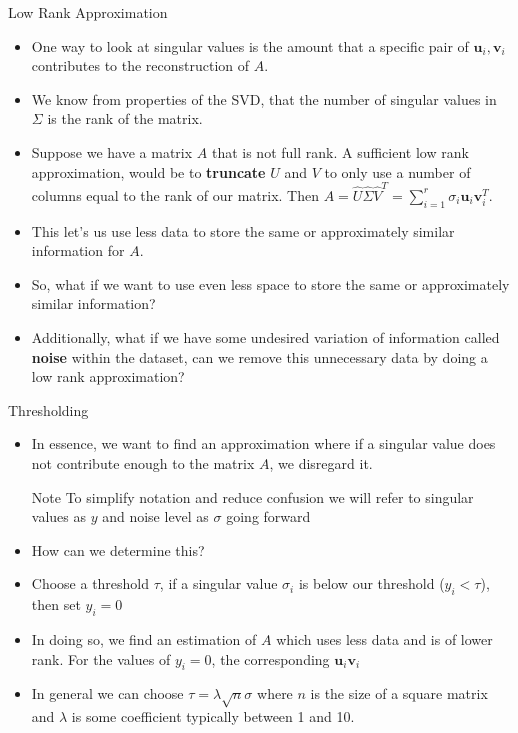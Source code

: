 \documentclass[aspectratio=169,xcolor=dvipsnames]{beamer}
\renewcommand{\vec}[1]{\mathbf{#1}}
\begin{document}
	
	\begin{frame}{Low Rank Approximation}
		\begin{itemize}
			\item One way to look at singular values is the amount that a specific pair of $\vec{u}_i, \vec{v}_i$ contributes to the reconstruction of $A$.
			\item We know from properties of the SVD, that the number of singular values in $\Sigma$ is the rank of the matrix.
			\item Suppose we have a matrix $A$ that is not full rank. A sufficient low rank approximation, would be to \textbf{truncate} $U$ and $V$ to only use a number of columns equal to the rank of our matrix. Then $A = \hat{U}\hat{\Sigma}\hat{V}^T = \sum_{i=1}^{r} \sigma_i\vec{u}_i\vec{v}_i^T$. 
			\item This let's us use less data to store the same or approximately similar information for $A$.
			\item So, what if we want to use even less space to store the same or approximately similar information?
			\item Additionally, what if we have some undesired variation of information called \textbf{noise} within the dataset, can we remove this unnecessary data by doing a low rank approximation?
		\end{itemize}
	\end{frame}
	
	\begin{frame}{Thresholding}
		\begin{itemize}
			\item In essence, we want to find an approximation where if a singular value does not contribute enough to the matrix $A$, we disregard it.
	\begin{block}{Note}
		To simplify notation and reduce confusion we will refer to singular values as $y$ and noise level as $\sigma$ going forward
	\end{block}
			\item How can we determine this?
			\item Choose a threshold $\tau$, if a singular value $\sigma_i$ is below our threshold ($y_i < \tau$), then set $y_i=0$
			\item In doing so, we find an estimation of $A$ which uses less data and is of lower rank. For the values of $y_i = 0$, the corresponding $\vec{u}_i\vec{v}_i$
			\item In general we can choose $\tau = \lambda\sqrt{n}\sigma$\cite{Chatterjee2015} where $n$ is the size of a square matrix and $\lambda$ is some coefficient typically between 1 and 10.
		\end{itemize}
	\end{frame}
	
\end{document}
